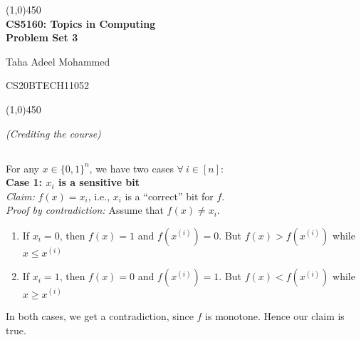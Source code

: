 \documentclass{article}
\renewcommand{\author}{Taha Adeel Mohammed}
\newcommand{\rollnumber}{CS20BTECH11052}
\newcommand{\course}{CS5160: Topics in Computing}
\newcommand{\assignment}{Problem Set 3}
\newcommand{\E}[2]{\mathop{\mathbb{E}}_{#1}\left[#2\right]}
\renewcommand{\maketitle}{
	\begin{center}
		\line(1,0){450} \\
		\vspace*{1ex}
        \Large{\textbf{\course}} \\
        \Large{\textbf{\assignment}} \\
    \end{center}
	\large{\author}
	\begin{flushright}
		\vspace*{-5ex}
		\rollnumber\\
	\end{flushright}
	\begin{center}
		\vspace*{-1ex}
		\line(1,0){450}
	\end{center}
}
\begin{document}
\maketitle

\textit{(Crediting the course)}

\subsection{} \vspace*{-8mm}


For any $x \in {\{0, 1\}}^n$, we have two cases $\forall\ i \in [n]$: \\

\noindent
\textbf{Case 1: $x_i$ is a sensitive bit} \\
\textit{Claim:} $f(x) = x_i$, i.e., $x_i$ is a ``correct'' bit for $f$. \\
\textit{Proof by contradiction:} Assume that $f(x) \neq x_i$.
\begin{enumerate}
	\item If $x_i = 0$, then $f(x) = 1$ and $f(x^{(i)}) = 0$. But $f(x) > f(x^{(i)})$ while $x \leq x^{(i)}$
	\item If $x_i = 1$, then $f(x) = 0$ and $f(x^{(i)}) = 1$. But $f(x) < f(x^{(i)})$ while $x \geq x^{(i)}$
\end{enumerate}
In both cases, we get a contradiction, since $f$ is monotone. Hence our claim is true. \\
\end{document}
